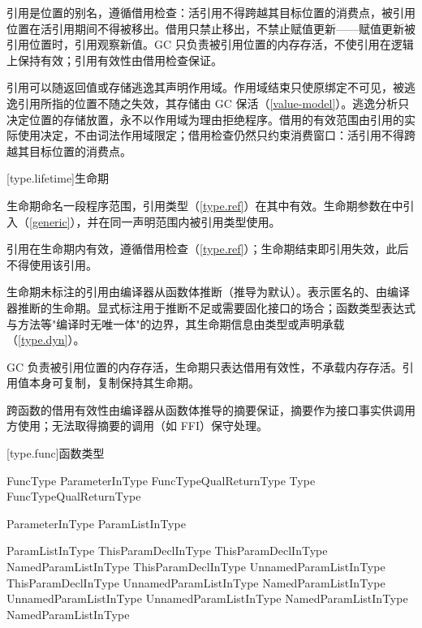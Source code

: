 \pnum
引用是位置的别名，遵循借用检查：活引用不得跨越其目标位置的消费点，被引用位置在活引用期间不得被移出。借用只禁止移出，不禁止赋值更新——赋值更新被引用位置时，引用观察新值。GC 只负责被引用位置的内存存活，不使引用在逻辑上保持有效；引用有效性由借用检查保证。

\pnum
引用可以随返回值或存储逃逸其声明作用域。作用域结束只使原绑定不可见，被逃逸引用所指的位置不随之失效，其存储由 GC 保活（\ref{value-model}）。逃逸分析只决定位置的存储放置，永不以作用域为理由拒绝程序。借用的有效范围由引用的实际使用决定，不由词法作用域限定；借用检查仍然只约束消费窗口：活引用不得跨越其目标位置的消费点。

[type.lifetime]{生命期}

\pnum
生命期命名一段程序范围，引用类型（\ref{type.ref}）在其中有效。生命期参数在中引入（\ref{generic}），并在同一声明范围内被引用类型使用。

\pnum
引用在生命期内有效，遵循借用检查（\ref{type.ref}）；生命期结束即引用失效，此后不得使用该引用。

\pnum
生命期未标注的引用由编译器从函数体推断（推导为默认）。表示匿名的、由编译器推断的生命期。显式标注用于推断不足或需要固化接口的场合；函数类型表达式与方法等"编译时无唯一体"的边界，其生命期信息由类型或声明承载（\ref{type.dyn}）。

\pnum
GC 负责被引用位置的内存存活，生命期只表达借用有效性，不承载内存存活。引用值本身可复制，复制保持其生命期。

\pnum
跨函数的借用有效性由编译器从函数体推导的摘要保证，摘要作为接口事实供调用方使用；无法取得摘要的调用（如 FFI）保守处理。

[type.func]{函数类型}

\begin{bnf}{FuncType}
    ParameterInType FuncTypeQual\bnfs ReturnType \br
    Type FuncTypeQual\bnfs ReturnType
\end{bnf}

\begin{bnf}{ParameterInType}
    \terminal{(} ParamListInType\bnfq \terminal{)}
\end{bnf}

\begin{bnf}{ParamListInType}
    ThisParamDeclInType \br
    ThisParamDeclInType \terminal{,} NamedParamListInType \br
    ThisParamDeclInType \terminal{,} UnnamedParamListInType \br
    ThisParamDeclInType \terminal{,} UnnamedParamListInType \terminal{,} NamedParamListInType \br
    UnnamedParamListInType \br
    UnnamedParamListInType \terminal{,} NamedParamListInType \br
    NamedParamListInType
\end{bnf}

